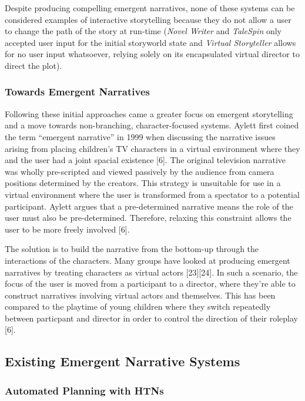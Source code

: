 \documentclass{sig-alternate-05-2015}
\begin{document}
\newline Despite producing compelling emergent narratives, none of these systems can be considered examples of interactive storytelling because they do not allow a user to change the path of the story at run-time (\textit{Novel Writer} and \textit{TaleSpin} only accepted user input for the initial storyworld state and \textit{Virtual Storyteller} allows for no user input whatsoever, relying solely on its encapsulated virtual director to direct the plot).\\

\subsubsection{Towards Emergent Narratives}

\noindent Following these initial approaches came a greater focus on emergent storytelling and a move towards non-branching, character-focused systems. Aylett first coined the term ``emergent narrative'' in 1999 when discussing the narrative issues arising from placing children's TV characters in a virtual environment where they and the user had a joint spacial existence [6]. The original television narrative was wholly pre-scripted and viewed passively by the audience from camera positions determined by the creators. This strategy is unsuitable for use in a virtual environment where the user is transformed from a spectator to a potential participant. Aylett argues that a pre-determined narrative means the role of the user must also be pre-determined. Therefore, relaxing this constraint allows the user to be more freely involved [6].

The solution is to build the narrative from the bottom-up through the interactions of the characters. Many groups have looked at producing emergent narratives by treating characters as virtual actors [23][24]. In such a scenario, the focus of the user is moved from a participant to a director, where they're able to construct narratives involving virtual actors and themselves. This has been compared to the playtime of young children where they switch repeatedly between particpant and director in order to control the direction of their roleplay [6].

\subsection{Existing Emergent Narrative Systems}

\subsubsection{Automated Planning with HTNs}
\end{document}
